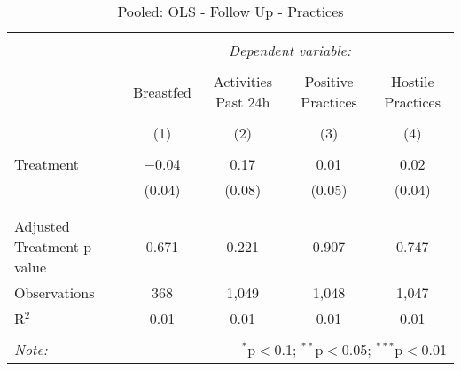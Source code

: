 
\begin{table}[!htbp] \centering 
  \caption{Pooled: OLS - Follow Up - Practices} 
  \label{tbl:Pooled: OLS - Follow Up - Practices} 
\begin{tabular}{@{\extracolsep{5pt}}lcccc} 
\\[-1.8ex]\hline 
\hline \\[-1.8ex] 
 & \multicolumn{4}{c}{\textit{Dependent variable:}} \\ 
\cline{2-5} 
\\[-1.8ex] & Breastfed & Activities Past 24h & Positive Practices & Hostile Practices \\ 
\\[-1.8ex] & (1) & (2) & (3) & (4)\\ 
\hline \\[-1.8ex] 
 Treatment & $-$0.04 & 0.17 & 0.01 & 0.02 \\ 
  & (0.04) & (0.08) & (0.05) & (0.04) \\ 
  & & & & \\ 
\hline \\[-1.8ex] 
Adjusted Treatment p-value & 0.671 & 0.221 & 0.907 & 0.747 \\ 
Observations & 368 & 1,049 & 1,048 & 1,047 \\ 
R$^{2}$ & 0.01 & 0.01 & 0.01 & 0.01 \\ 
\hline 
\hline \\[-1.8ex] 
\textit{Note:}  & \multicolumn{4}{r}{$^{*}$p$<$0.1; $^{**}$p$<$0.05; $^{***}$p$<$0.01} \\ 
\end{tabular} 
\end{table} 
